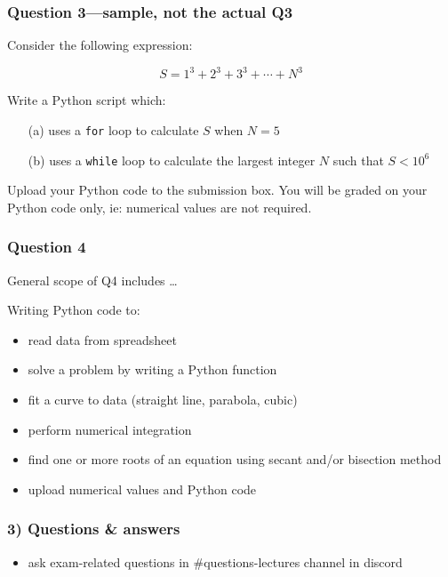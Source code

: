 \documentclass[english,14pt]{beamer}
\begin{document}
\begin{frame}[fragile]

\frametitle{Question 3---sample, not the actual Q3}

Consider the following expression:

\[
	S = 1^3 + 2^3 + 3^3 + \cdots + N^3
\]

Write a Python script which:

\begin{itemize}
\item[(a)] uses a \texttt{for} loop to calculate $S$ when $N = 5$

\item[(b)] uses a \texttt{while} loop to calculate the largest integer $N$ such that $S < 10^6$

\end{itemize}

Upload your Python code to the submission box. You will be graded on your Python code only, ie: numerical values are not required.

\end{frame}


\begin{frame}[fragile]

\frametitle{Question 4}

General scope of Q4 includes \ldots

Writing Python code to:

\begin{itemize}
	\item read data from spreadsheet
	\item solve a problem by writing a Python function
	\item fit a curve  to data (straight line, parabola, cubic)
	\item perform numerical integration
	\item find one or more roots of an equation using secant and/or bisection method
	\item[]
	\item upload numerical values and Python code
\end{itemize}

\end{frame}


\begin{frame}[fragile]

\frametitle{3) Questions \& answers}

\begin{itemize}
	\item ask exam-related questions in \#questions-lectures channel in discord
\end{itemize}

\end{frame}
\end{document}

